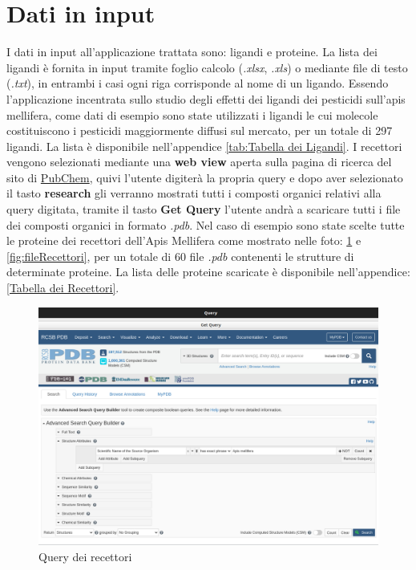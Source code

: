 \section{Dati in input}
I dati in input all'applicazione trattata sono: ligandi e proteine. La lista dei ligandi è fornita in input tramite foglio calcolo (\textit{.xlsx}, \textit{.xls}) o mediante file di testo (\textit{.txt}), 
in entrambi i casi ogni riga corrisponde al nome di un ligando. Essendo l'applicazione incentrata sullo studio degli effetti dei ligandi dei pesticidi sull'apis mellifera, 
come dati di esempio sono state utilizzati i ligandi le cui molecole costituiscono i pesticidi maggiormente diffusi sul mercato, per un totale di 297 ligandi. La lista è disponibile nell'appendice \ref{tab:Tabella dei Ligandi}.\newline
I recettori vengono selezionati mediante una \textbf{web view} aperta sulla pagina di ricerca del sito di \href{https://www.rcsb.org/search}{PubChem}, quivi l'utente digiterà la propria query e 
dopo aver selezionato il  tasto \textbf{research} gli verranno mostrati tutti i composti organici relativi alla query digitata, tramite il tasto \textbf{Get Query} l'utente andrà a 
scaricare tutti i file  dei composti organici in formato \textit{.pdb}. Nel caso di esempio sono state scelte tutte le proteine dei recettori dell'Apis Mellifera come mostrato nelle foto: 
\ref{fig:queryRecettori} e  \ref{fig:fileRecettori}, per un totale di 60 file \textit{.pdb} contenenti le strutture di determinate proteine. La lista delle proteine scaricate è disponibile nell'appendice: \ref{Tabella dei Recettori}.

\begin{figure}[H]
    \centering
    \includegraphics[scale=0.4]{immagini/queryRecettori.png}
    \caption{Query dei recettori}
    \label{fig:queryRecettori}
\end{figure}

